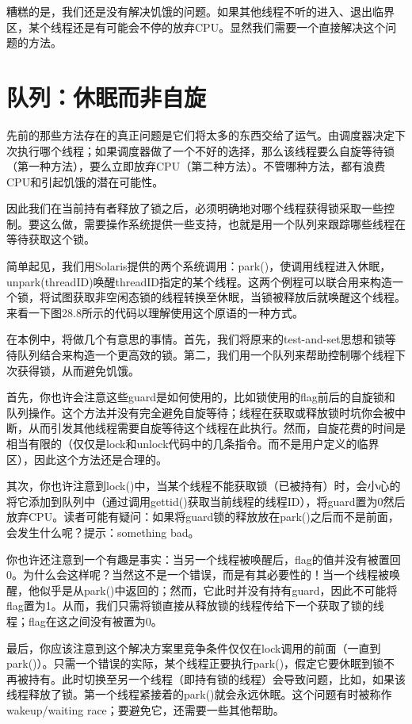 糟糕的是，我们还是没有解决饥饿的问题。如果其他线程不听的进入、退出临界区，某个线程还是有可能会不停的放弃CPU。显然我们需要一个直接解决这个问题的方法。


\section{队列：休眠而非自旋}

先前的那些方法存在的真正问题是它们将太多的东西交给了运气。由调度器决定下次执行哪个线程；如果调度器做了一个不好的选择，那么该线程要么自旋等待锁（第一种方法），要么立即放弃CPU（第二种方法）。不管哪种方法，都有浪费CPU和引起饥饿的潜在可能性。

因此我们在当前持有者释放了锁之后，必须明确地对哪个线程获得锁采取一些控制。要这么做，需要操作系统提供一些支持，也就是用一个队列来跟踪哪些线程在等待获取这个锁。

简单起见，我们用Solaris提供的两个系统调用：park()，使调用线程进入休眠，unpark(threadID)唤醒threadID指定的某个线程。这两个例程可以联合用来构造一个锁，将试图获取非空闲态锁的线程转换至休眠，当锁被释放后就唤醒这个线程。来看一下图28.8所示的代码以理解使用这个原语的一种方式。


在本例中，将做几个有意思的事情。首先，我们将原来的test-and-set思想和锁等待队列结合来构造一个更高效的锁。第二，我们用一个队列来帮助控制哪个线程下次获得锁，从而避免饥饿。

首先，你也许会注意这些guard是如何使用的，比如锁使用的flag前后的自旋锁和队列操作。这个方法并没有完全避免自旋等待；线程在获取或释放锁时坑你会被中断，从而引发其他线程需要自旋等待这个线程在此执行。然而，自旋花费的时间是相当有限的（仅仅是lock和unlock代码中的几条指令。而不是用户定义的临界区），因此这个方法还是合理的。

其次，你也许注意到lock()中，当某个线程不能获取锁（已被持有）时，会小心的将它添加到队列中（通过调用gettid()获取当前线程的线程ID），将guard置为0然后放弃CPU。读者可能有疑问：如果将guard锁的释放放在park()之后而不是前面，会发生什么呢？提示：something bad。

你也许还注意到一个有趣是事实：当另一个线程被唤醒后，flag的值并没有被置回0。为什么会这样呢？当然这不是一个错误，而是有其必要性的！当一个线程被唤醒，他似乎是从park()中返回的；然而，它此时并没有持有guard，因此不可能将flag置为1。从而，我们只需将锁直接从释放锁的线程传给下一个获取了锁的线程；flag在这之间没有被置为0。

最后，你应该注意到这个解决方案里竞争条件仅仅在lock调用的前面（一直到park()）。只需一个错误的实际，某个线程正要执行park()，假定它要休眠到锁不再被持有。此时切换至另一个线程（即持有锁的线程）会导致问题，比如，如果该线程释放了锁。第一个线程紧接着的park()就会永远休眠。这个问题有时被称作wakeup/waiting race；要避免它，还需要一些其他帮助。

